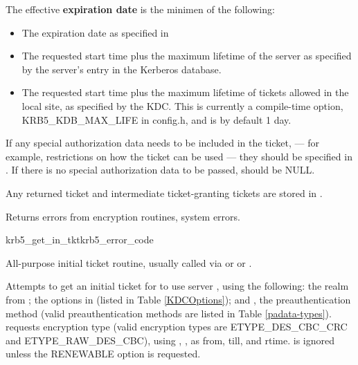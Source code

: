 The effective {\bf expiration date} is the minimen of the following:
\begin{itemize}
\item The expiration date as specified in
\item The requested start time plus the maximum lifetime of the
server as specified by the server's entry in the
Kerberos database.
\item The requested start time plus the maximum lifetime of tickets
allowed in the local site, as specified by the KDC.
This is currently a compile-time option,
KRB5_KDB_MAX_LIFE in config.h, and is by default 1 day.
\end{itemize}

If any special authorization data needs to be included in the ticket,
--- for example, restrictions on how the ticket can be used --- 
they should be specified in .   If there
is no special authorization data to be passed,
 should be NULL.

Any returned ticket and intermediate ticket-granting tickets are
stored in .

Returns errors from encryption routines, system errors.

\begin{funcdecl}{krb5_get_in_tkt}{krb5_error_code}{\funcin}
\funcendfuncarg
{}
\funcendfuncarg
{}
\funcinout
{}
\end{funcdecl}

All-purpose initial ticket routine, usually called via
 or
 or
.


Attempts to get an initial ticket for 
to use server , using the following:
the realm from ; the options in
 (listed in Table \ref{KDCOptions});
and , the preauthentication
method (valid preauthentication methods are listed in Table
\ref{padata-types}).
 requests encryption type
 (valid encryption types are ETYPE_DES_CBC_CRC and
ETYPE_RAW_DES_CBC),
using ,
,
as from, till, and rtime.   is
ignored unless the RENEWABLE option is requested.

